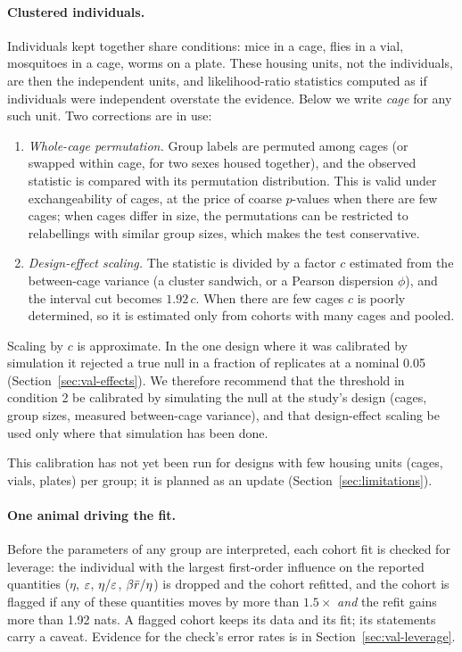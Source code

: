 \paragraph{Clustered individuals.} Individuals kept together share conditions: mice in a cage, flies in a vial,
mosquitoes in a cage, worms on a plate. These housing units, not the individuals, are then the independent units, and
likelihood-ratio statistics computed as if individuals were independent overstate the evidence. Below we write
\emph{cage} for any such unit. Two corrections are in use:
\begin{enumerate}[leftmargin=1.5em,itemsep=1pt]
  \item \emph{Whole-cage permutation.} Group labels are permuted among cages (or swapped within cage, for two sexes
    housed together), and the observed statistic is compared with its permutation distribution. This is valid under
    exchangeability of cages, at the price of coarse $p$-values when there are few cages; when cages differ in size,
    the permutations can be restricted to relabellings with similar group sizes, which makes the test conservative.
  \item \emph{Design-effect scaling.} The statistic is divided by a factor $c$ estimated from the between-cage
    variance (a cluster sandwich, or a Pearson dispersion $\phi$), and the interval cut becomes $1.92\,c$. When there
    are few cages $c$ is poorly determined, so it is estimated only from cohorts with many cages and pooled.
\end{enumerate}
Scaling by $c$ is approximate. In the one design where it was calibrated by simulation it rejected a true null in a fraction
 of replicates at a nominal 0.05 (Section~\ref{sec:val-effects}). We therefore recommend that the
threshold in condition 2 be calibrated by simulating the null at the study's design (cages, group sizes, measured
between-cage variance), and that design-effect scaling be used only where that simulation has been done.

This calibration has not yet been run for designs with few housing units (cages, vials, plates) per group; it is planned as an update
(Section~\ref{sec:limitations}).

\paragraph{One animal driving the fit.} Before the parameters of any group are interpreted, each cohort fit is checked
for leverage: the individual with the largest first-order influence on the reported quantities ($\eta$, $\varepsilon$,
$\eta/\varepsilon$, $\beta\bar r/\eta$) is dropped and the cohort refitted, and the cohort is flagged if any of these quantities
moves by more than $1.5\times$ \emph{and} the refit gains more than 1.92 nats. A flagged cohort keeps its data and its fit; its statements carry a caveat. Evidence for the check's error
rates is in Section~\ref{sec:val-leverage}.


